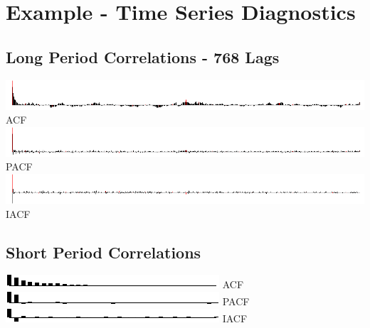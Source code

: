\documentclass[10pt]{sugconf-ish}
\begin{document}
\newpage
\section{Example - Time Series Diagnostics}
\subsection{Long Period Correlations - 768 Lags}
\includegraphics{spark_corr_id_.pdf} ACF\\
\includegraphics{spark_partcorr_id_.pdf} PACF\\
\includegraphics{spark_invcorr_id_.pdf} IACF\\

\subsection{Short Period Correlations }
\includegraphics{spark_corr_id_zoom.pdf} ACF\\
\includegraphics{spark_partcorr_id_zoom.pdf} PACF\\
\includegraphics{spark_invcorr_id_zoom.pdf} IACF\\
\end{document}
